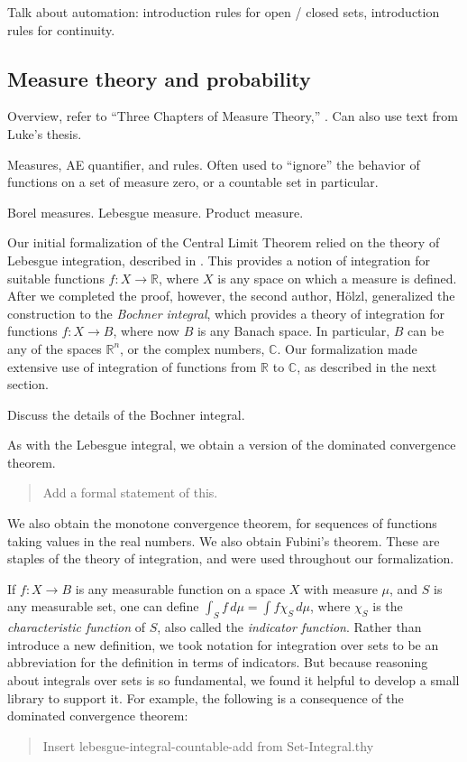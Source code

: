 \documentclass{svjour3}
\newcommand{\todo}[1]{{\color{red}#1}}
\newcommand{\RR}{\mathbb{R}}
\newcommand{\CC}{\mathbb{C}}
\begin{document}
\todo{Talk about automation: introduction rules for open / closed sets, introduction rules for continuity.}

\subsection{Measure theory and probability}

\todo{
Overview, refer to ``Three Chapters of Measure Theory,'' \cite{hoelzl:heller:11}. Can also use text from Luke's thesis.

Measures, AE quantifier, and rules. Often used to ``ignore'' the behavior of functions on a set of measure zero, or a countable set in particular. 

Borel measures. Lebesgue measure. Product measure.}

Our initial formalization of the Central Limit Theorem relied on the theory of Lebesgue integration, described in \cite{hoelzl:heller:11}. This provides a notion of integration for suitable functions $f : X \to \RR$, where $X$ is any space on which a measure is defined. After we completed the proof, however, the second author, H\"olzl, generalized the construction to the \emph{Bochner integral}, which provides a theory of integration for functions $f : X \to B$, where now $B$ is any Banach space. In particular, $B$ can be any of the spaces $\RR^n$, or the complex numbers, $\CC$. Our formalization made extensive use of integration of functions from $\RR$ to $\CC$, as described in the next section.

\todo{Discuss the details of the Bochner integral.}

As with the Lebesgue integral, we obtain a version of the dominated convergence theorem.
\begin{quote}
 \todo{Add a formal statement of this.}
\end{quote}
We also obtain the monotone convergence theorem, for sequences of functions taking values in the real numbers. We also obtain Fubini's theorem. These are staples of the theory of integration, and were used throughout our formalization.

If $f : X \to B$ is any measurable function on a space $X$ with measure $\mu$, and $S$ is any measurable set, one can define $\int_S f \, d\mu = \int f \chi_S \, d\mu$, where $\chi_S$ is the \emph{characteristic function} of $S$, also called the \emph{indicator function}. Rather than introduce a new definition, we took notation for integration over sets to be an abbreviation for the definition in terms of indicators. But because reasoning about integrals over sets is so fundamental, we found it helpful to develop a small library to support it. For example, the following is a consequence of the dominated convergence theorem:
\begin{quote}
\todo{Insert lebesgue-integral-countable-add from Set-Integral.thy}
\end{quote}
\end{document}
